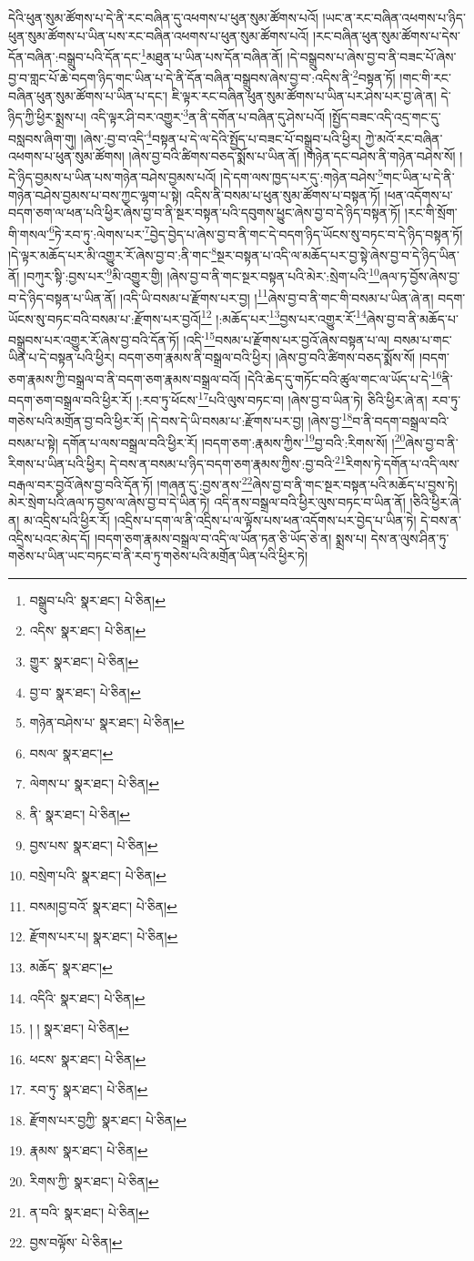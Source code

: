 དེའི་ཕུན་སུམ་ཚོགས་པ་དེ་ནི་རང་བཞིན་དུ་འཕགས་པ་ཕུན་སུམ་ཚོགས་པའོ། །ཡང་ན་རང་བཞིན་འཕགས་པ་ཉིད་ཕུན་སུམ་ཚོགས་པ་ཡིན་པས་རང་བཞིན་འཕགས་པ་ཕུན་སུམ་ཚོགས་པའོ། །རང་བཞིན་ཕུན་སུམ་ཚོགས་པ་དེས་དོན་བཞིན་:བསྒྲུབ་པའི་དོན་དང་\footnote{བསྒྲུབ་པའི་  སྣར་ཐང་།  པེ་ཅིན། }མཐུན་པ་ཡིན་པས་དོན་བཞིན་ནོ། །དེ་བསྒྲུབས་པ་ཞེས་བྱ་བ་ནི་བཟང་པོ་ཞེས་བྱ་བ་གླང་པོ་ཆེ་བདག་ཉིད་གང་ཡིན་པ་དེ་ནི་དོན་བཞིན་བསྒྲུབས་ཞེས་བྱ་བ་:འདིས་ནི་\footnote{འདིས་  སྣར་ཐང་།  པེ་ཅིན། }བསྟན་ཏོ། །གང་གི་རང་བཞིན་ཕུན་སུམ་ཚོགས་པ་ཡིན་པ་དང་། ཇི་ལྟར་རང་བཞིན་ཕུན་སུམ་ཚོགས་པ་ཡིན་པར་ཤེས་པར་བྱ་ཞེ་ན། དེ་ཉིད་ཀྱི་ཕྱིར་སྨྲས་པ། འདི་ལྟར་ཤི་བར་འགྱུར་\footnote{གྱུར་  སྣར་ཐང་།  པེ་ཅིན། }ན་ནི་དགོན་པ་བཞིན་དུ་ཤེས་པའོ། །སྤྱོད་བཟང་འདི་འདྲ་གང་དུ་བསླབས་ཞིག་གུ། །ཞེས་:བྱ་བ་འདི་\footnote{བྱ་བ་  སྣར་ཐང་།  པེ་ཅིན། }བསྟན་པ་དེ་ལ་དེའི་སྤྱོད་པ་བཟང་པོ་བསྒྲུབ་པའི་ཕྱིར། ཀྱེ་མའོ་རང་བཞིན་འཕགས་པ་ཕུན་སུམ་ཚོགས། །ཞེས་བྱ་བའི་ཚིགས་བཅད་སྨོས་པ་ཡིན་ནོ། །གཉེན་དང་བཤེས་ནི་གཉེན་བཤེས་སོ། །དེ་ཉིད་བྱམས་པ་ཡིན་པས་གཉེན་བཤེས་བྱམས་པའོ། །དེ་དག་ལས་ཁྱད་པར་དུ་:གཉེན་བཤེས་\footnote{གཉེན་བཤེས་པ་  སྣར་ཐང་།  པེ་ཅིན། }གང་ཡིན་པ་དེ་ནི་གཉེན་བཤེས་བྱམས་པ་བས་ཀྱང་ལྷག་པ་སྟེ། འདིས་ནི་བསམ་པ་ཕུན་སུམ་ཚོགས་པ་བསྟན་ཏོ། །ཕན་འདོགས་པ་བདག་ཅག་ལ་ཕན་པའི་ཕྱིར་ཞེས་བྱ་བ་ནི་སྔར་བསྟན་པའི་དབུགས་ཕྱུང་ཞེས་བྱ་བ་དེ་ཉིད་བསྟན་ཏོ། །རང་གི་སྲོག་གི་གསལ་\footnote{བསལ་  སྣར་ཐང་། }ཏེ་རབ་ཏུ་:ལེགས་པར་\footnote{ལེགས་པ་  སྣར་ཐང་།  པེ་ཅིན། }བྱེད་བྱེད་པ་ཞེས་བྱ་བ་ནི་གང་དེ་བདག་ཉིད་ཡོངས་སུ་བཏང་བ་དེ་ཉིད་བསྟན་ཏོ། །དེ་ལྟར་མཆོད་པར་མི་འགྱུར་རོ་ཞེས་བྱ་བ་:ནི་གང་\footnote{ནི་  སྣར་ཐང་།  པེ་ཅིན། }སྔར་བསྟན་པ་འདི་ལ་མཆོད་པར་བྱ་སྟེ་ཞེས་བྱ་བ་དེ་ཉིད་ཡིན་ནོ། །བཀུར་སྟི་:བྱས་པར་\footnote{བྱས་པས་  སྣར་ཐང་།  པེ་ཅིན། }མི་འགྱུར་གྱི། །ཞེས་བྱ་བ་ནི་གང་སྔར་བསྟན་པའི་མེར་:སྲེག་པའི་\footnote{བསྲེག་པའི་  སྣར་ཐང་།  པེ་ཅིན། }ཞལ་ཏ་བྱོས་ཞེས་བྱ་བ་དེ་ཉིད་བསྟན་པ་ཡིན་ནོ། །འདི་ཡི་བསམ་པ་རྫོགས་པར་བྱ། །\footnote{བསམ།བྱ་བའོ་  སྣར་ཐང་།  པེ་ཅིན། }ཞེས་བྱ་བ་ནི་གང་གི་བསམ་པ་ཡིན་ཞེ་ན། བདག་ཡོངས་སུ་བཏང་བའི་བསམ་པ་:རྫོགས་པར་བྱའོ།\footnote{རྫོགས་པར་པ།  སྣར་ཐང་།  པེ་ཅིན། } །:མཆོད་པར་\footnote{མཆོད་  སྣར་ཐང་། }བྱས་པར་འགྱུར་རོ་\footnote{འདིའི་  སྣར་ཐང་།  པེ་ཅིན། }ཞེས་བྱ་བ་ནི་མཆོད་པ་བསྒྲུབས་པར་འགྱུར་རོ་ཞེས་བྱ་བའི་དོན་ཏོ། །འདི་\footnote{། །  སྣར་ཐང་།  པེ་ཅིན། }བསམ་པ་རྫོགས་པར་བྱའོ་ཞེས་བསྟན་པ་ལ། བསམ་པ་གང་ཡིན་པ་དེ་བསྟན་པའི་ཕྱིར། བདག་ཅག་རྣམས་ནི་བསྒྲལ་བའི་ཕྱིར། །ཞེས་བྱ་བའི་ཚིགས་བཅད་སྨོས་སོ། །བདག་ཅག་རྣམས་ཀྱི་བསྒྲལ་བ་ནི་བདག་ཅག་རྣམས་བསྒྲལ་བའོ། །དེའི་ཆེད་དུ་གཏོང་བའི་ཚུལ་གང་ལ་ཡོད་པ་དེ་\footnote{ཕངས་  སྣར་ཐང་།  པེ་ཅིན། }ནི་བདག་ཅག་བསྒྲལ་བའི་ཕྱིར་རོ། །:རབ་ཏུ་ཕོངས་\footnote{རབ་ཏུ་  སྣར་ཐང་།  པེ་ཅིན། }པའི་ལུས་བཏང་བ། །ཞེས་བྱ་བ་ཡིན་ཏེ། ཅིའི་ཕྱིར་ཞེ་ན། རབ་ཏུ་གཅེས་པའི་མགྲོན་བྱ་བའི་ཕྱིར་རོ། །དེ་བས་དེ་ཡི་བསམ་པ་:རྫོགས་པར་བྱ། །ཞེས་བྱ་\footnote{རྫོགས་པར་བྱཀྱི་  སྣར་ཐང་།  པེ་ཅིན། }བ་ནི་བདག་བསྒྲལ་བའི་བསམ་པ་སྟེ། དགོན་པ་ལས་བསྒྲལ་བའི་ཕྱིར་རོ། །བདག་ཅག་:རྣམས་ཀྱིས་\footnote{རྣམས་  སྣར་ཐང་།  པེ་ཅིན། }བྱ་བའི་:རིགས་སོ། །\footnote{རིགས་ཀྱི་  སྣར་ཐང་།  པེ་ཅིན། }ཞེས་བྱ་བ་ནི་རིགས་པ་ཡིན་པའི་ཕྱིར། དེ་བས་ན་བསམ་པ་ཉིད་བདག་ཅག་རྣམས་ཀྱིས་:བྱ་བའི་\footnote{ན་བའི་  སྣར་ཐང་།  པེ་ཅིན། }རིགས་ཏེ་དགོན་པ་འདི་ལས་བརྒལ་བར་བྱའོ་ཞེས་བྱ་བའི་དོན་ཏོ། །གཞན་དུ་:བྱས་ནས་\footnote{བྱས་བལྟོས་  པེ་ཅིན། }ཞེས་བྱ་བ་ནི་གང་སྔར་བསྟན་པའི་མཆོད་པ་བྱས་ཏེ། མེར་སྲེག་པའི་ཞལ་ཏ་བྱས་ལ་ཞེས་བྱ་བ་དེ་ཡིན་ཏེ། འདི་ནས་བསྒྲལ་བའི་ཕྱིར་ལུས་བཏང་བ་ཡིན་ནོ། །ཅིའི་ཕྱིར་ཞེ་ན། མ་འདྲིས་པའི་ཕྱིར་རོ། །འདྲིས་པ་དག་ལ་ནི་འདྲིས་པ་ལ་ལྟོས་པས་ཕན་འདོགས་པར་བྱེད་པ་ཡིན་ཏེ། དེ་བས་ན་འདྲིས་པའང་མེད་དོ། །བདག་ཅག་རྣམས་བསྒྲལ་བ་འདི་ལ་ཡོན་ཏན་ཅི་ཡོད་ཅེ་ན། སྨྲས་པ། དེས་ན་ལུས་ཤིན་ཏུ་གཅེས་པ་ཡིན་ཡང་བཏང་བ་ནི་རབ་ཏུ་གཅེས་པའི་མགྲོན་ཡིན་པའི་ཕྱིར་ཏེ། 